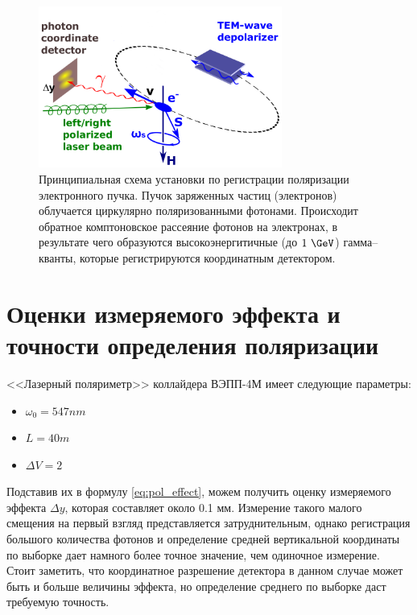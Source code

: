 \begin{figure}[H]
	\begin{center}
		\includegraphics[width = 8cm]{img/mrd-lsrp.png}
		\caption{Принципиальная схема установки по регистрации поляризации электронного пучка. Пучок заряженных частиц (электронов) облучается циркулярно поляризованными фотонами. Происходит обратное комптоновское рассеяние фотонов на электронах, в результате чего образуются высокоэнергитичные (до $1~\GeV$) гамма--кванты, которые регистрируются координатным детектором.}
		\label{fig:laser_polarimeter_scheme}
	\end{center}
\end{figure}
\vspace{-20pt}
\section{Оценки измеряемого эффекта и точности определения поляризации }
<<Лазерный поляриметр>> коллайдера ВЭПП-4М имеет следующие параметры: 
\begin{itemize}
	\item $\omega_0 = 547 nm$ 
	\item $L = 40 m$
	\item $\Delta V = 2$
\end{itemize}
Подставив их в формулу \ref{eq:pol_effect}, можем получить оценку измеряемого эффекта $\Delta y$, которая составляет около  0.1 мм. Измерение такого малого смещения на первый взгляд представляется затруднительным, однако регистрация большого количества фотонов и определение средней вертикальной координаты по выборке дает намного более точное значение, чем одиночное измерение. Стоит заметить, что координатное разрешение детектора в данном случае может быть и больше величины эффекта, но определение среднего по выборке даст требуемую точность. 